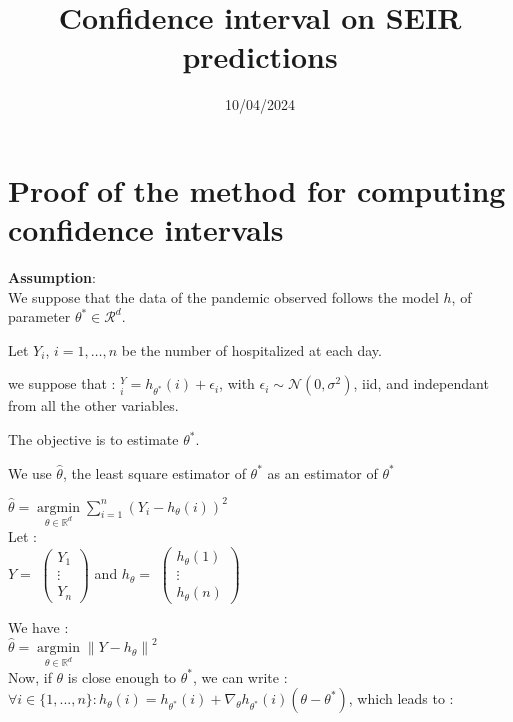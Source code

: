 \documentclass{article}
\title{Confidence interval on SEIR predictions}
\author{}
\date{10/04/2024}
\begin{document}
\maketitle

\section{Proof of the method for computing confidence intervals}

\textbf{Assumption}: \\

We suppose that the data of the pandemic observed follows the model $h$, of parameter $\theta^* \in \mathcal{R}^d$.

Let $Y_i$, $ i = 1, \ldots, n$ be the number of hospitalized at each day. 

we suppose that : $^Y_i = h_{\theta ^* } (i) + \epsilon_i$, with $\epsilon_i \sim \mathcal{N}(0, \sigma^2)$, iid, and independant from all the other variables. 

The objective is to estimate $\theta^*$. 

We use $\hat{\theta}$, the least square estimator of $\theta^*$ as an estimator of $\theta ^* $ 

$\hat{\theta} =  \underset{\theta \in \mathbb{R}^d}{\operatorname{argmin}} \sum_{i=1}^{n} (Y_i - h_{\theta}(i))^2$ \\

Let : \\


$ Y = $ $\begin{pmatrix}
Y_1 \\
\vdots \\
Y_n
\end{pmatrix}$
 and $h_\theta = $ $\begin{pmatrix}
h_\theta(1) \\
\vdots \\
h_\theta(n)
\end{pmatrix}$


We have : \\

$ \hat{\theta} =  \underset{\theta \in \mathbb{R}^d}{\operatorname{argmin}}  \left\lVert Y - h_\theta \right\rVert ^2 $\\

Now, if $\theta$ is close enough to $\theta^*$, we can write : \\


$\forall i \in \{ 1, ..., n\} :  h_\theta(i) = h_{\theta ^* } (i ) + \nabla_\theta h_{\theta^*}(i) (\theta - \theta^*) $,   which leads to :\\
\end{document}
